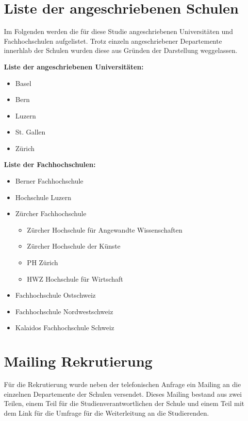 \begin{RaggedRight}

\section{Liste der angeschriebenen Schulen}\label{appendix.ListeSchulen}
Im Folgenden werden die für diese Studie angeschriebenen Universitäten und Fachhochschulen aufgelistet. Trotz einzeln angeschriebener Departemente innerhlab der Schulen wurden diese aus Gründen der Darstellung weggelassen.\par
\textbf{Liste der angeschriebenen Universitäten:}
\begin{itemize}
    \item Basel
    \item Bern
    \item Luzern
    \item St. Gallen
    \item Zürich
\end{itemize}
\textbf{Liste der Fachhochschulen:}
\begin{itemize}
    \item Berner Fachhochschule
    \item Hochschule Luzern
    \item Zürcher Fachhochschule
    \begin{itemize}
        \item Zürcher Hochschule für Angewandte Wissenschaften
        \item Zürcher Hochschule der Künste
        \item PH Zürich
        \item HWZ Hochschule für Wirtschaft
    \end{itemize}
    \item Fachhochschule Ostschweiz
    \item Fachhochschule Nordwestschweiz 
    \item Kalaidos Fachhochschule Schweiz
\end{itemize}


\section{Mailing Rekrutierung}\label{appendix.mailing}
Für die Rekrutierung wurde neben der telefonischen Anfrage ein Mailing an die einzelnen Departemente der Schulen versendet. Dieses Mailing bestand aus zwei Teilen, einem Teil für die Studienverantwortlichen der Schule und einem Teil mit dem Link für die Umfrage für die Weiterleitung an die Studierenden.


\end{RaggedRight}
